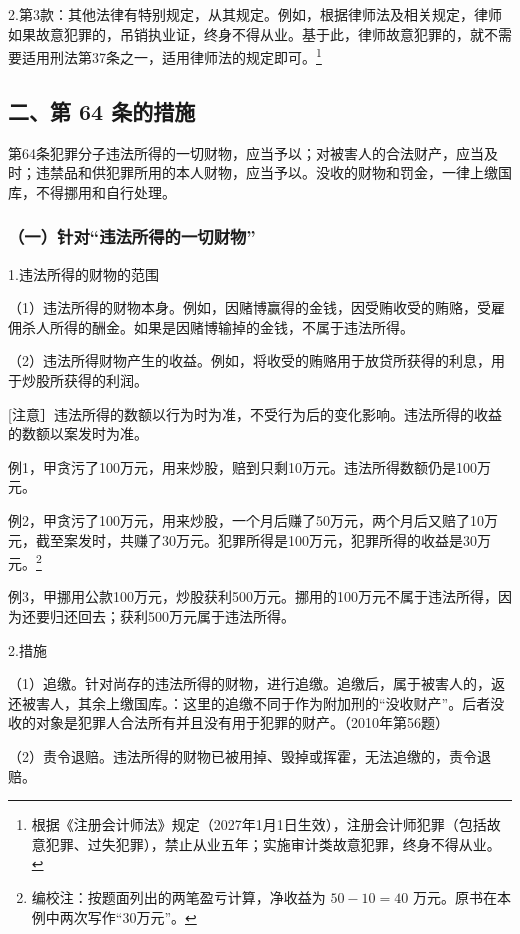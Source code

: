 2.第3款：其他法律有特别规定，从其规定。例如，根据律师法及相关规定，律师如果故意犯罪的，吊销执业证，终身不得从业。基于此，律师故意犯罪的，就不需要适用刑法第37条之一，适用律师法的规定即可。\footnote{根据《注册会计师法》规定（2027年1月1日生效），注册会计师犯罪（包括故意犯罪、过失犯罪），禁止从业五年；实施审计类故意犯罪，终身不得从业。}

\subsection*{二、第 64 条的措施}

第64条犯罪分子违法所得的一切财物，应当予以；对被害人的合法财产，应当及时；违禁品和供犯罪所用的本人财物，应当予以。没收的财物和罚金，一律上缴国库，不得挪用和自行处理。

\subsubsection*{（一）针对“违法所得的一切财物”}

1.违法所得的财物的范围

（1）违法所得的财物本身。例如，因赌博赢得的金钱，因受贿收受的贿赂，受雇佣杀人所得的酬金。如果是因赌博输掉的金钱，不属于违法所得。

（2）违法所得财物产生的收益。例如，将收受的贿赂用于放贷所获得的利息，用于炒股所获得的利润。

[注意］违法所得的数额以行为时为准，不受行为后的变化影响。违法所得的收益的数额以案发时为准。

例1，甲贪污了100万元，用来炒股，赔到只剩10万元。违法所得数额仍是100万元。

例2，甲贪污了100万元，用来炒股，一个月后赚了50万元，两个月后又赔了10万元，截至案发时，共赚了30万元。犯罪所得是100万元，犯罪所得的收益是30万元。\footnote{编校注：按题面列出的两笔盈亏计算，净收益为 \(50-10=40\) 万元。原书在本例中两次写作“30万元”。}

例3，甲挪用公款100万元，炒股获利500万元。挪用的100万元不属于违法所得，因为还要归还回去；获利500万元属于违法所得。

2.措施

（1）追缴。针对尚存的违法所得的财物，进行追缴。追缴后，属于被害人的，返还被害人，其余上缴国库。：这里的追缴不同于作为附加刑的“没收财产”。后者没收的对象是犯罪人合法所有并且没有用于犯罪的财产。（2010年第56题）

（2）责令退赔。违法所得的财物已被用掉、毁掉或挥霍，无法追缴的，责令退赔。

